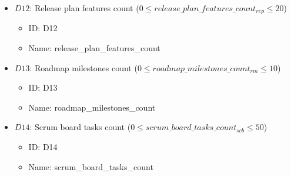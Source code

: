 \documentclass{article}
\begin{document}
\begin{itemize}
\begin{itemize}
        \end{itemize}
    \item $D12$: Release plan features count ($0 \leq release\_plan\_features\_count_{rep} \leq 20$)
        \begin{itemize}
            \item ID: D12
            \item Name: release\_plan\_features\_count
        \end{itemize}
    \item $D13$: Roadmap milestones count ($0 \leq roadmap\_milestones\_count_{rm} \leq 10$)
        \begin{itemize}
            \item ID: D13
            \item Name: roadmap\_milestones\_count
        \end{itemize}
    \item $D14$: Scrum board tasks count ($0 \leq scrum\_board\_tasks\_count_{scb} \leq 50$)
        \begin{itemize}
            \item ID: D14
            \item Name: scrum\_board\_tasks\_count
        \end{itemize}
\end{itemize}
\end{document}

